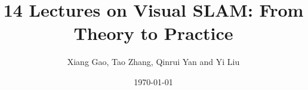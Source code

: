 \documentclass[a4paper,9pt,openleft]{book}
\begin{document}
\title{14 Lectures on Visual SLAM: From Theory to Practice}
\author{Xiang Gao, Tao Zhang, Qinrui Yan and Yi Liu}
\date{\today}

\frontmatter
\maketitle
\tableofcontents

\mainmatter 
{}
\hypersetup{bookmarksdepth=2}


%

\appendix
{}
\hypersetup{bookmarksdepth=2}


\backmatter
\small


\newpage
\end{document}
